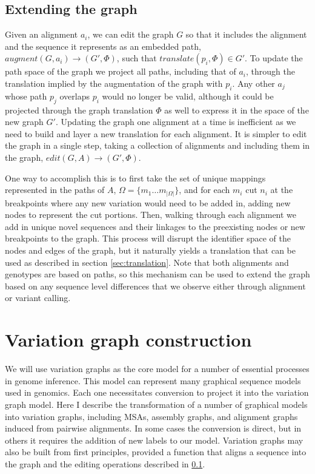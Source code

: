 \subsection{Extending the graph}
\label{sec:extending}

Given an alignment $a_i$, we can edit the graph $G$ so that it includes the alignment and the sequence it represents as an embedded path, $augment(G, a_i) \to (G', \Phi)$, such that $translate(p_i, \Phi) \in G'$.
To update the path space of the graph we project all paths, including that of $a_i$, through the translation implied by the augmentation of the graph with $p_i$.
Any other $a_j$ whose path $p_j$ overlaps $p_i$ would no longer be valid, although it could be projected through the graph translation $\Phi$ as well to express it in the space of the new graph $G'$.
Updating the graph one alignment at a time is inefficient as we need to build and layer a new translation for each alignment.
It is simpler to edit the graph in a single step, taking a collection of alignments and including them in the graph, $edit(G, A) \to (G', \Phi)$.

One way to accomplish this is to first take the set of unique mappings represented in the paths of $A$, $\Omega = \{ m_1 \ldots m_{|\Omega|}\}$, and for each $m_i$ cut $n_i$ at the breakpoints where any new variation would need to be added in, adding new nodes to represent the cut portions.
Then, walking through each alignment we add in unique novel sequences and their linkages to the preexisting nodes or new breakpoints to the graph.
This process will disrupt the identifier space of the nodes and edges of the graph, but it naturally yields a translation that can be used as described in section \ref{sec:translation}.
Note that both alignments and genotypes are based on paths, so this mechanism can be used to extend the graph based on any sequence level differences that we observe either through alignment or variant calling.

\section{Variation graph construction}

We will use variation graphs as the core model for a number of essential processes in genome inference.
This model can represent many graphical sequence models used in genomics.
Each one necessitates conversion to project it into the variation graph model.
Here I describe the transformation of a number of graphical models into variation graphs, including MSAs, assembly graphs, and alignment graphs induced from pairwise alignments.
In some cases the conversion is direct, but in others it requires the addition of new labels to our model.
Variation graphs may also be built from first principles, provided a function that aligns a sequence into the graph and the editing operations described in \ref{sec:extending}.

